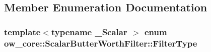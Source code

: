 \subsection{Member Enumeration Documentation}
\subsubsection[{\texorpdfstring{Filter\+Type}{FilterType}}]{\setlength{\rightskip}{0pt plus 5cm}template$<$typename \+\_\+\+Scalar $>$ enum {\bf ow\+\_\+core\+::\+Scalar\+Butter\+Worth\+Filter\+::\+Filter\+Type}}\hypertarget{classow__core_1_1ScalarButterWorthFilter_aa2ad57d5d67aa7bb2310a52d6e35c0af}{}\label{classow__core_1_1ScalarButterWorthFilter_aa2ad57d5d67aa7bb2310a52d6e35c0af}
